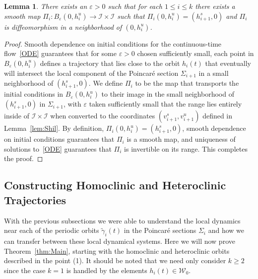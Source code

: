 \documentclass[11pt]{article}
\newcommand{\W}{\mathcal{W}}
\numberwithin{equation}{section}
\theoremstyle{plain}
\newtheorem{lem}[theorem]{Lemma}
\begin{document}
\begin{lem}\label{lem:PushForward} %
	There exists an $\varepsilon > 0$ such that for each $1 \leq i \leq k$ there exists a smooth map $\Pi_i: B_\varepsilon(0,h^u_i) \to \mathcal{I}\times\mathcal{I}$ such that $\Pi_i(0,h^u_i) = (h^s_{i+1},0)$ and $\Pi_i$ is diffeomorphism in a neighborhood of $(0,h^u_i)$. 
\end{lem}

\begin{proof}
Smooth dependence on initial conditions for the continuous-time flow~\eqref{ODE} guarantees that for some $\varepsilon > 0$ chosen sufficiently small, each point in $B_\varepsilon(0,h^u_i)$ defines a trajectory that lies close to the orbit $h_i(t)$ that eventually will intersect the local component of the Poincar\'e section $\Sigma_{i+1}$ in a small neighborhood of $(h^s_{i+1},0)$. We define $\Pi_i$ to be the map that transports the initial conditions in $B_\varepsilon(0,h^u_i)$ to their image in the small neighborhood of $(h^s_{i+1},0)$ in $\Sigma_{i+1}$, with $\varepsilon$ taken sufficiently small that the range lies entirely inside of $\mathcal{I}\times\mathcal{I}$ when converted to the coordinates $(v^s_{i+1},v^u_{i+1})$ defined in Lemma~\ref{lem:Shil}. By definition, $\Pi_i(0,h^u_i) = (h^s_{i+1},0)$, smooth dependence on initial conditions guarantees that $\Pi_i$ is a smooth map, and uniqueness of solutions to~\eqref{ODE} guarantees that $\Pi_i$ is invertible on its range. This completes the proof. 	
\end{proof} %






\subsection{Constructing Homoclinic and Heteroclinic Trajectories}\label{subsec:HomHet}

With the previous subsections we were able to understand the local dynamics near each of the periodic orbits $\tilde\gamma_i(t)$ in the Poincar\'e sections $\Sigma_i$ and how we can transfer between these local dynamical systems. Here we will now prove Theorem~\ref{thm:Main}, starting with the homoclinic and heteroclinic orbits described in the point (1). It should be noted that we need only consider $k \geq 2$ since the case $k = 1$ is handled by the elements $h_i(t) \in \W_0$. 
\end{document}

